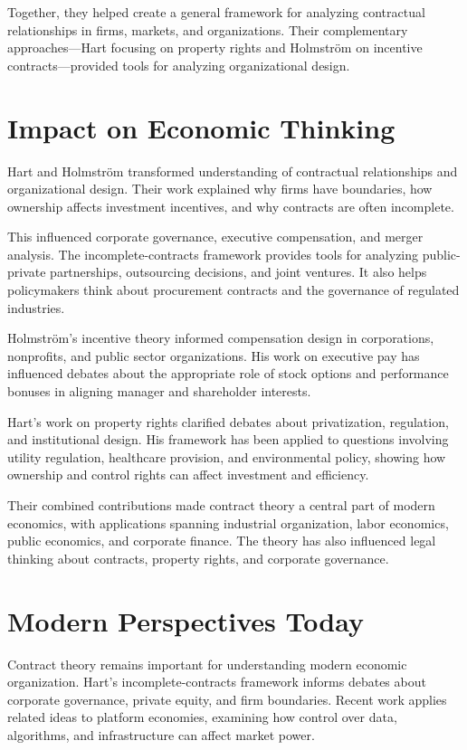 Together, they helped create a general framework for analyzing contractual
relationships in firms, markets, and organizations. Their complementary
approaches---Hart focusing on property rights and Holmström on incentive
contracts---provided tools for analyzing organizational design.

\section{Impact on Economic Thinking}
Hart and Holmström transformed understanding of contractual relationships and
organizational design. Their work explained why firms have boundaries, how
ownership affects investment incentives, and why contracts are often incomplete.

This influenced corporate governance, executive compensation, and merger analysis.
The incomplete-contracts framework provides tools for analyzing public-private
partnerships, outsourcing decisions, and joint ventures. It also helps
policymakers think about procurement contracts and the governance of regulated
industries.

Holmström's incentive theory informed compensation design in corporations,
nonprofits, and public sector organizations. His work on executive pay has
influenced debates about the appropriate role of stock options and performance
bonuses in aligning manager and shareholder interests.

Hart's work on property rights clarified debates about privatization, regulation,
and institutional design. His framework has been applied to questions involving
utility regulation, healthcare provision, and environmental policy, showing how
ownership and control rights can affect investment and efficiency.

Their combined contributions made contract theory a central part of modern
economics, with applications spanning industrial organization, labor economics,
public economics, and corporate finance. The theory has also influenced legal
thinking about contracts, property rights, and corporate governance.

\section{Modern Perspectives Today}
Contract theory remains important for understanding modern economic organization.
Hart's incomplete-contracts framework informs debates about corporate governance,
private equity, and firm boundaries. Recent work applies related ideas to platform
economies, examining how control over data, algorithms, and infrastructure can
affect market power.

